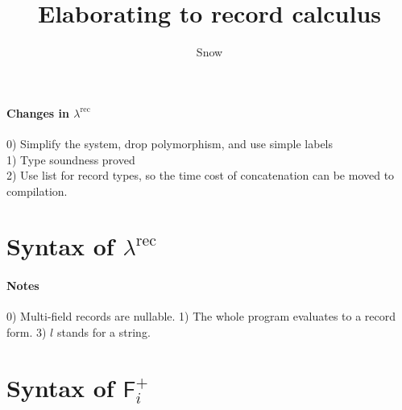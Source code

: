 \documentclass{article}
\title{Elaborating \calculus to record calculus \reccal}
\author{Snow}
\newcommand\calculus{$\mathsf{F}_i^+$\xspace}
\newcommand\reccal{$\lambda^{\text{rec}}$\xspace}
\begin{document}
\maketitle


\paragraph{Changes in \reccal}
0) Simplify the system, drop polymorphism, and use simple labels\\
1) Type soundness proved\\
2) Use list for record types, so the time cost of concatenation can be
moved to compilation.

\section{Syntax of \reccal}

\ottgrammartabular{
  \ottttyp
}

\ottgrammartabular{
  \otttexp
}


\paragraph{Notes}
0) Multi-field records are nullable.
1) The whole program evaluates to a record form.
3) $l$ stands for a string.



\ottdefnsValues

\ottdefnsTargetStep

\ottdefnsConcatTypes

\ottdefnsRecordTypes

\ottdefnsWelformedTypes

\ottdefnsConcatTypes

\ottdefnsTargetTyping


\newpage
\section{Syntax of \calculus}
\end{document}
